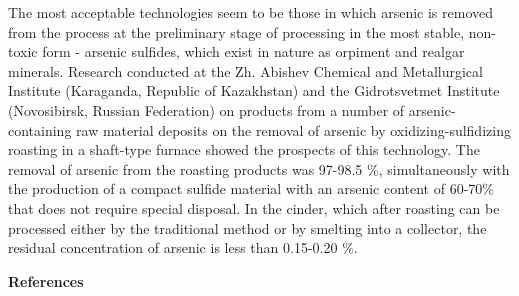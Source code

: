 \begin{multicols}{2}
The most acceptable technologies seem to be those in which arsenic is
removed from the process at the preliminary stage of processing in the
most stable, non-toxic form - arsenic sulfides, which exist in nature as
orpiment and realgar minerals. Research conducted at the Zh. Abishev
Chemical and Metallurgical Institute (Karaganda, Republic of Kazakhstan)
and the Gidrotsvetmet Institute (Novosibirsk, Russian Federation) on
products from a number of arsenic-containing raw material deposits on
the removal of arsenic by oxidizing-sulfidizing roasting in a shaft-type
furnace showed the prospects of this technology. The removal of arsenic
from the roasting products was 97-98.5 \%, simultaneously with the
production of a compact sulfide material with an arsenic content of
60-70\% that does not require special disposal. In the cinder, which
after roasting can be processed either by the traditional method or by
smelting into a collector, the residual concentration of arsenic is less
than 0.15-0.20 \%.
\end{multicols}

\begin{center}
{\bfseries References}
\end{center}

